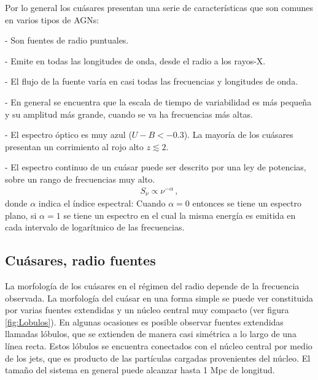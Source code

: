 Por lo general los cuásares presentan una serie de características que son comunes en varios tipos de AGNs:


- Son fuentes de radio puntuales. 

- Emite en todas las longitudes de onda, desde el radio a los rayos-X.

- El flujo de la fuente varía en casi todas las frecuencias y longitudes de onda.

- En general se encuentra que la escala de tiempo de variabilidad es más pequeña y su amplitud más grande, cuando se va ha frecuencias más altas.

- El espectro óptico es muy azul ($U-B < -0.3$). La mayoría de los cuásares presentan un corrimiento al rojo alto  $z \lesssim 2$.

- El espectro continuo de un cuásar puede ser descrito por una ley de potencias, sobre un rango de frecuencias muy alto.
%
\begin{align}
S_{\nu} \propto \nu^{-\alpha} \,,
\end{align}
%
 donde $\alpha$ indica el índice espectral: Cuando $\alpha=0$ entonces se tiene un espectro plano, si $\alpha=1$ se tiene un espectro en el cual la misma energía es emitida en cada intervalo de logarítmico de las frecuencias. 


	\subsection{Cuásares, radio fuentes}
	\label{subsec:}

La morfología de los cuásares en el régimen del radio depende de la frecuencia observada. La morfología del cuásar en una forma simple se puede ver constituida por varias fuentes extendidas y un núcleo central muy compacto (ver figura \ref{fig:Lobulos}). En algunas ocasiones es posible observar fuentes extendidas llamadas lóbulos, que se extienden de manera casi simétrica a lo largo de una línea recta. Estos lóbulos se encuentra conectados con el núcleo central por medio de los jets, que es producto de las partículas cargadas provenientes del núcleo. El tamaño del sistema en general puede alcanzar hasta 1 Mpc de longitud. %

